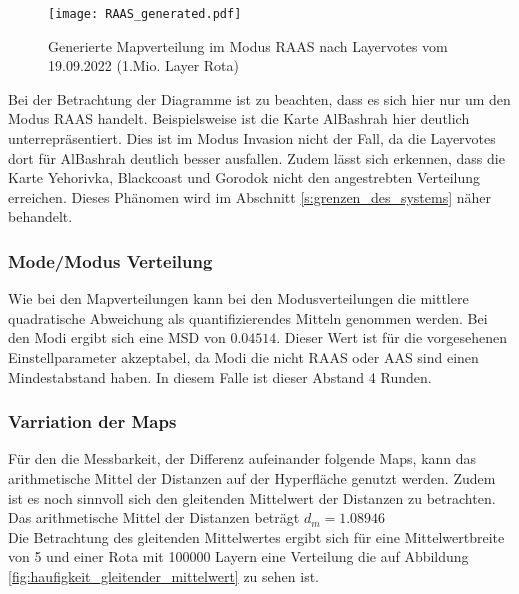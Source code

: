             \begin{figure}[htbp]
                \centering
                \texttt{[image: RAAS\_generated.pdf]}
                \caption{Generierte Mapverteilung im Modus RAAS nach Layervotes vom 19.09.2022 (1.Mio. Layer Rota)}
                \label{fig:generated_mapverteilung_raas}
            \end{figure}

            Bei der Betrachtung der Diagramme 
            ist zu beachten, dass es sich hier nur um den Modus RAAS handelt.
            Beispielsweise ist die Karte AlBashrah hier deutlich unterrepräsentiert. Dies ist im Modus Invasion
            nicht der Fall, da die Layervotes dort für AlBashrah deutlich besser ausfallen.
            Zudem lässt sich erkennen, dass die Karte Yehorivka, Blackcoast und Gorodok nicht den angestrebten
            Verteilung erreichen. Dieses Phänomen wird im Abschnitt \ref{s:grenzen_des_systems} näher behandelt.

        \subsubsection{Mode/Modus Verteilung}
            Wie bei den Mapverteilungen kann bei den Modusverteilungen die mittlere quadratische Abweichung als
            quantifizierendes Mitteln genommen werden. Bei den Modi ergibt sich eine MSD von $0.04514$.
            Dieser Wert ist für die vorgesehenen Einstellparameter akzeptabel, da Modi die nicht RAAS oder AAS sind
            einen Mindestabstand haben. In diesem Falle ist dieser Abstand 4 Runden.\\
        \subsubsection{Varriation der Maps}
            Für den die Messbarkeit, der Differenz aufeinander folgende Maps, kann das arithmetische Mittel der Distanzen
            auf der Hyperfläche genutzt werden. Zudem ist es noch sinnvoll sich den gleitenden Mittelwert der Distanzen
            zu betrachten.\\
            Das arithmetische Mittel der Distanzen beträgt $d_m = 1.08946$\\
            Die Betrachtung des gleitenden Mittelwertes ergibt sich für eine Mittelwertbreite von 5 und einer Rota mit 100000 Layern
            eine Verteilung die auf Abbildung \ref{fig:haufigkeit_gleitender_mittelwert} zu sehen ist.
            
